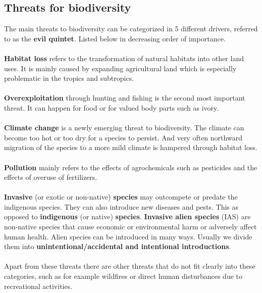 \documentclass[../summary.tex]{subfiles}
\begin{document}
	
	\subsection{Threats for biodiversity}
	The main threats to biodiversity can be categorized in 5 different drivers, referred to as the \textbf{evil quintet}. Listed below in decreasing order of importance.
	\\\\
	\textbf{Habitat loss} refers to the transformation of natural habitats into other land uses. It is mainly caused by expanding agricultural land which is especially problematic in the tropics and subtropics.
	\\\\
	\textbf{Overexploitation} through hunting and fishing is the second most important threat. It can happen for food or for valued body parts such as ivory.
	\\\\
	\textbf{Climate change} is a newly emerging threat to biodiversity. The climate can become too hot or too dry for a species to persist. And very often northward migration of the species to a more mild climate is hampered through habitat loss.
	\\\\
	\textbf{Pollution} mainly refers to the effects of agrochemicals such as pesticides and the effects of overuse of fertilizers.
	\\\\
	\textbf{Invasive} (or exotic or non-native) \textbf{species} may outcompete or predate the indigenous species. They can also introduce new diseases and pests. This as opposed to \textbf{indigenous} (or native) \textbf{species}.
	\textbf{Invasive alien species} (IAS) are non-native species that cause economic or environmental harm or adversely affect human health.
	Alien species can be introduced in many ways. Usually we divide them into \textbf{unintentional/accidental and intentional introductions}.
	\\\\
	Apart from these threats there are other threats that do not fit clearly into these categories, such as for example wildfires or direct human disturbances due to recreational activities.
\end{document}
